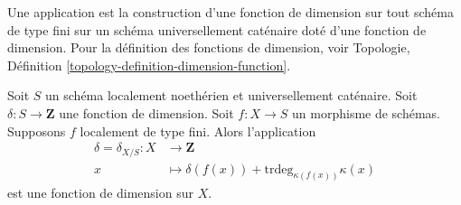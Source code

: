 \noindent
Une application est la construction d'une fonction de dimension
sur tout schéma de type fini sur un schéma universellement
caténaire doté d'une fonction de dimension.
Pour la définition des fonctions
de dimension, voir Topologie, Définition \ref{topology-definition-dimension-function}.

\begin{lemma}
\label{lemma-dimension-function-propagates}
Soit $S$ un schéma localement noethérien et universellement caténaire.
Soit $\delta : S \to \mathbf{Z}$ une fonction de dimension. Soit $f : X \to S$
un morphisme de schémas. Supposons $f$
localement de type fini. Alors
l'application
\begin{align*}
\delta = \delta_{X/S} : X & \longrightarrow \mathbf{Z} \\
x & \longmapsto \delta(f(x)) + \text{trdeg}_{\kappa(f(x))} \kappa(x)
\end{align*}
est une fonction de dimension sur $X$.
\end{lemma}


